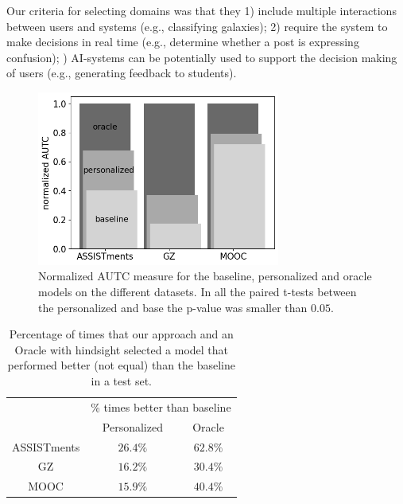 \documentclass[letterpaper]{article} %
\theoremstyle{definition}
\newcommand{\kibitz}[2]{\ifnum\Comments=1{\color{#1}{#2}}\fi}
\newcommand{\li}[1]{\kibitz{brown}{[LL:#1]}}
\begin{document}
 Our criteria for selecting domains was that they 1) include multiple interactions between users and systems (e.g., classifying galaxies); 2) require  the system to make decisions in real time (e.g., determine whether a post is expressing confusion); \li{In this example the system is making decisions in real time, not the user. Maybe you meant that the system has to make decisions in real time?} 3) AI-systems can be potentially used to support the decision making of users (e.g., generating feedback to students).
%
\begin{figure}[t]
     \centering
     \includegraphics[width=8cm]{bar_graph}
     \caption{Normalized AUTC measure for the baseline, personalized and oracle models on the different datasets. In all the paired t-tests between the personalized and base the p-value was smaller than $0.05$.}
    \label{fig:bar_graph}
\end{figure}
%
\begin{table}[t]
    \begin{center}
    {
    \setlength{\tabcolsep}{4pt}
    \begin{tabular}{c|cc}
    \hline
    \rule{0pt}{12pt}
    \multirow{2}{*}{Dataset}&\multicolumn{2}{c}{\% times better than baseline}\\
    \rule{0pt}{12pt}
    & Personalized& Oracle
    \\\hline
    \rule{0pt}{12pt}ASSISTments&$26.4\%$&$62.8\%$\\
    \rule{0pt}{12pt}GZ&$16.2\%$&$30.4\%$\\
    \rule{0pt}{12pt}MOOC&$15.9\%$&$40.4\%$\\
    \hline
    \end{tabular}
    \caption{Percentage of times that our approach and an Oracle with hindsight selected a model that performed better (not equal) than the baseline in a test set.}
    \label{tab:agent_results}}
    \end{center}
\end{table}
\end{document}

